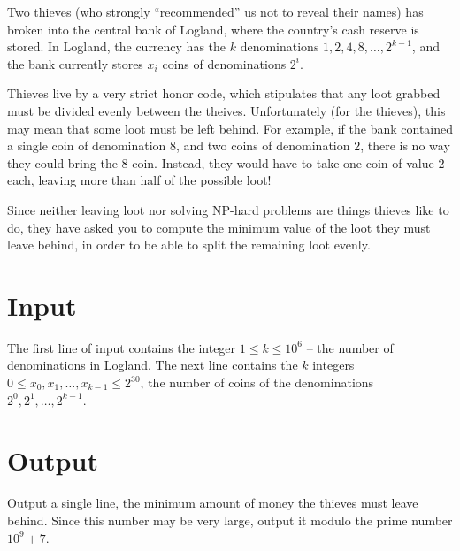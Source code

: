 Two thieves (who strongly ``recommended'' us not to reveal their names) has broken into the central bank of Logland, where the country's cash reserve is stored.
In Logland, the currency has the $k$ denominations $1, 2, 4, 8, \ldots, 2^{k - 1}$, and the bank currently stores $x_i$ coins of denominations $2^i$.

Thieves live by a very strict honor code, which stipulates that any loot grabbed must be divided evenly between the theives.
Unfortunately (for the thieves), this may mean that some loot must be left behind.
For example, if the bank contained a single coin of denomination $8$, and two coins of denomination $2$, there is no way they could bring the $8$ coin.
Instead, they would have to take one coin of value $2$ each, leaving more than half of the possible loot!

Since neither leaving loot nor solving NP-hard problems are things thieves like to do, they have asked you to compute the minimum value of the loot they must leave behind, in order to be able to
split the remaining loot evenly.

\section*{Input}
The first line of input contains the integer $1 \le k \le 10^6$ -- the number of denominations in Logland.
The next line contains the $k$ integers $0 \le x_0, x_1, \dots, x_{k-1} \le 2^{30}$, the number of coins of the denominations $2^0, 2^1, \dots, 2^{k - 1}$.

\section*{Output}
Output a single line, the minimum amount of money the thieves must leave behind.
Since this number may be very large, output it modulo the prime number $10^9 + 7$.
